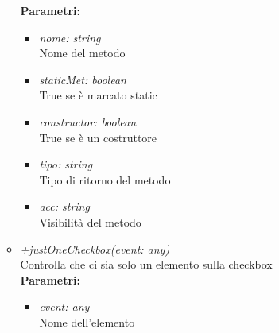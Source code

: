 \begin{itemize}
\begin{itemize}
    		\textbf{Parametri:}
    		\begin{itemize}
    			\item \emph{nome: string}\\
    			Nome del metodo
    			\item \emph{staticMet: boolean}\\
    			True se è marcato static
    			\item \emph{constructor: boolean}\\
    			True se è un costruttore
    			\item \emph{tipo: string}\\
    			Tipo di ritorno del metodo
    			\item \emph{acc: string}\\
    			Visibilità del metodo
    		\end{itemize}
    		\item \emph{+justOneCheckbox(event: any)}\\
    		Controlla che ci sia solo un elemento sulla checkbox\\
    		\textbf{Parametri:}
    		\begin{itemize}
    			\item \emph{event: any}\\
    			Nome dell'elemento
    		\end{itemize}
		\end{itemize}
\end{itemize}